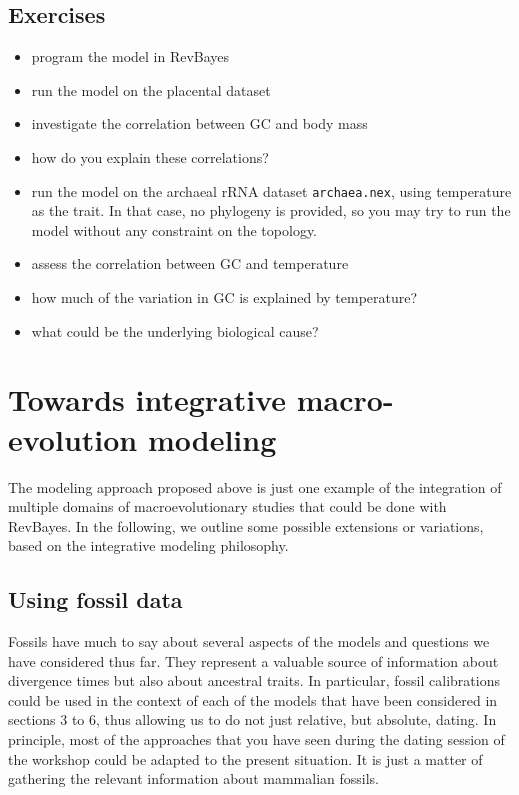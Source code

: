 \documentclass[usletter]{article}
\newcommand{\cmd}[1]{\texttt{#1}}
\begin{document}
\subsection*{Exercises}

\begin{itemize}
\item
program the model in RevBayes
\item
run the model on the placental dataset
\item
investigate the correlation between GC and body mass
\item
how do you explain these correlations?
\item
run the model on the archaeal rRNA dataset \cmd{archaea.nex}, using temperature as the trait. In that case, no phylogeny is provided, so you may try to run the model without any constraint on the topology.
\item
assess the correlation between GC and temperature
\item
how much of the variation in GC is explained by temperature?
\item
what could be the underlying biological cause?
\end{itemize}


\section{Towards integrative macro-evolution modeling}

The modeling approach proposed above is just one example of the integration of multiple domains of macroevolutionary studies that could be done with RevBayes.
In the following, we outline some possible extensions or variations, based on the integrative modeling philosophy.

\subsection*{Using fossil data}

Fossils have much to say about several aspects of the models and questions we have considered thus far.
They represent a valuable source of information about divergence times but also about ancestral traits.
In particular, fossil calibrations could be used in the context of each of the models that have been considered in sections 3 to 6, thus allowing us to do not just relative, but absolute, dating. In principle, most of the approaches that you have seen during the dating session of the workshop could be adapted to the present situation. It is just a matter of gathering the relevant information about mammalian fossils.
\end{document}
